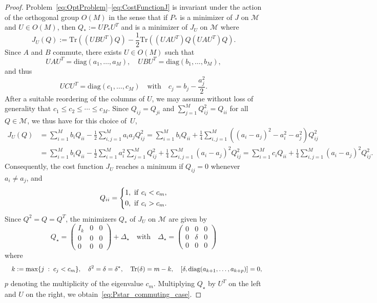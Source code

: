 \documentclass{article}
\newcommand{\tr}{{\rm Tr}}
\newcommand{\1}{{\mathds 1}}
\begin{document}
\begin{proof} Problem~\eqref{eq:OptProblem}--\eqref{eq:CostFunctionJ} is invariant under the action of the orthogonal group $O(M)$ in the sense that if $P_*$ is a minimizer of $J$ on $\mathcal M$ and $U \in O(M)$, then $Q_*:=UP_*U^T$ and is a minimizer of $J_U$ on $\mathcal M$ where
$$
 J_U(Q) := \text{Tr}((UBU^T)Q)- \frac{1}{2} \text{Tr}((UAU^T) Q(UAU^T) Q) .
$$
Since $A$ and $B$ commute, 
there exists $U \in O(M)$ such that
$$
UAU^T = \text{diag}(a_{1}, \dots, a_{M}), \quad UBU^T = \text{diag}(b_{1}, \dots, b_{M}),
$$
and thus 
$$
 UCU^T = \text{diag}(c_{1}, \dots, c_{M}) \quad \mbox{with} \quad c_j = b_j-\frac{a_j^2}2.
$$
After a suitable reordering of the columns of $U$, we may assume without loss of generality that $c_1 \le c_2 \le \cdots \le c_M$. Since $Q_{ij}=Q_{ji}$ and $\sum_{j=1}^M Q_{ij}^2 = Q_{ii}$ for all $Q \in \mathcal M$, we thus have for this choice of~$U$, 
\begin{align*}
         J_U(Q) & = \sum_{i = 1}^{M} b_i Q_{ii} - \frac{1}{2} \sum_{i,j=1}^{M} a_{i} a_{j} Q_{ij}^2  = \sum_{i = 1}^{M} b_i Q_{ii} + \frac{1}{4} \sum_{i,j=1}^{M}( (a_i -a_j)^2 - a_{i}^2 - a_{j}^2) Q_{ij}^2 \\
         &= \sum_{i = 1}^{M} b_i Q_{ii} -  \frac 12 \sum_{i=1}^M a_{i}^2 \sum_{j=1}^M Q_{ij}^2  + \frac{1}{4} \sum_{i,j=1}^M  (a_i -a_j)^2 Q_{ij}^2  = \sum_{i = 1}^{M} c_iQ_{ii} + \frac{1}{4} \sum_{i,j=1}^{M} (a_i -a_j)^2Q_{ij}^2.
         \end{align*}
Consequently, the cost function $J_U$ reaches a minimum if $Q_{ij} = 0$ whenever $a_i \neq a_j$, and 
\begin{equation*}
Q_{ii} = 
\left\lbrace 
\begin{aligned}
1,~{\rm if}~c_i < c_m,  \\
0,~{\rm if}~c_i > c_m.
\end{aligned}
\right.
\end{equation*}
Since $Q^2=Q=Q^T$, the minimizers $Q_*$ of $J_U$ on $\mathcal M$ are given by
\begin{equation} \label{eq:decomp_Pstar}
      Q_\star =  \left( \begin{array}{ccc} I_k & 0 & 0 \\ 0 & 0 & 0 \\ 0 & 0 & 0 \end{array} \right) + \Delta_\star \quad \mbox{with} \quad \Delta_\star =  \left( \begin{array}{ccc} 0 & 0 & 0 \\ 0 & \delta & 0 \\ 0 & 0 & 0 \end{array} \right) \end{equation}
      where
      $$
      \quad k:=\max\{j \; : \; c_j < c_m\}, \quad \delta^2 = \delta=\delta^*, \quad \tr(\delta)=m-k, \quad [\delta,\text{diag}(a_{k+1}, \dots, a_{k+p})]=0,
      $$
       $p$ denoting the multiplicity of the eigenvalue $c_m$.
Multiplying $Q_\star$ by $U^T$ on the left and $U$ on the right, we obtain~\eqref{eq:Pstar_commuting_case}. 


\end{proof}
\end{document}
